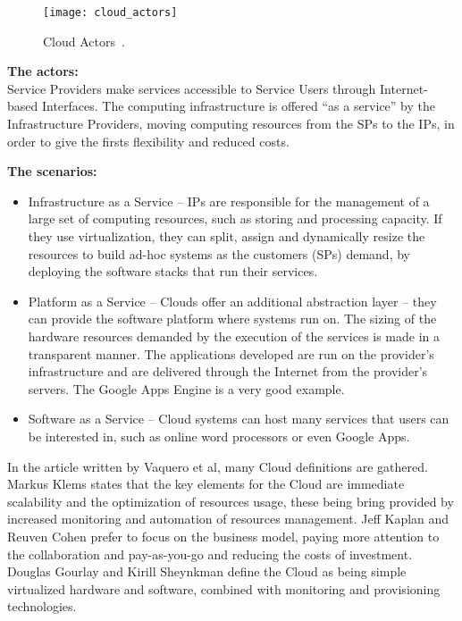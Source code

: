 \begin{figure}[t]
  \begin{center}
    \leavevmode
    \texttt{[image: cloud\_actors]}
    \caption{Cloud Actors~\cite{Buyya2009599}.}
    \label{fig:cloud_actors}
  \end{center}
\end{figure}

\textbf{The actors:}\\
Service Providers make services accessible to Service Users through Internet-based Interfaces. The computing infrastructure is offered “as a service” by the Infrastructure Providers, moving computing resources from the SPs to the IPs, in order to give the firsts flexibility and reduced costs.

\textbf{The scenarios:}
\begin{itemize}
\item Infrastructure as a Service – IPs are responsible for the management of a large set of computing resources, such as storing and processing capacity. If they use virtualization, they can split, assign and dynamically resize the resources to build ad-hoc systems as the customers (SPs) demand, by deploying the software stacks that run their services.
\item Platform as a Service – Clouds offer an additional abstraction layer – they can provide the software platform where systems run on. The sizing of the hardware resources demanded by the execution of the services is made in a transparent manner. The applications developed are run on the provider's infrastructure and are delivered through the Internet from the provider's servers. The Google Apps Engine is a very good example.
\item Software as a Service – Cloud systems can host many services that users can be interested in, such as online word processors or even Google Apps. \cite{knorr,vaquero}
\end{itemize}

In the article written by Vaquero et al, many Cloud definitions are gathered. Markus Klems states that the key elements for the Cloud are immediate scalability and the optimization of resources usage, these being bring provided by increased monitoring and automation of resources management. Jeff Kaplan and Reuven Cohen prefer to focus on the business model, paying more attention to the collaboration and pay-as-you-go and reducing the costs of investment. Douglas Gourlay and Kirill Sheynkman define the Cloud as being simple virtualized hardware and software, combined with monitoring and provisioning technologies. \cite{21experts,vaquero}

